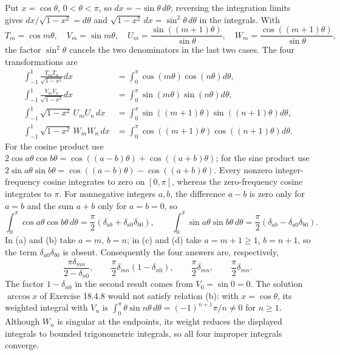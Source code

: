 Put $x=\cos\theta$, $0<\theta<\pi$, so $dx=-\sin\theta\,d\theta$;
reversing the integration limits gives $dx/\sqrt{1-x^2}=d\theta$ and
$\sqrt{1-x^2}\,dx=\sin^2\theta\,d\theta$ in the integrals.
With
\[
T_m=\cos m\theta,\quad V_m=\sin m\theta,\quad
U_m=\frac{\sin((m+1)\theta)}{\sin\theta},\quad
W_m=\frac{\cos((m+1)\theta)}{\sin\theta},
\]
the factor $\sin^2\theta$ cancels the two denominators in the last two
cases.
The four transformations are
\begin{align*}
\int_{-1}^1\frac{T_mT_n}{\sqrt{1-x^2}}dx
 &=\int_0^\pi\cos(m\theta)\cos(n\theta)d\theta,\\
\int_{-1}^1\frac{V_mV_n}{\sqrt{1-x^2}}dx
 &=\int_0^\pi\sin(m\theta)\sin(n\theta)d\theta,\\
\int_{-1}^1\sqrt{1-x^2}\,U_mU_n\,dx
 &=\int_0^\pi\sin((m+1)\theta)\sin((n+1)\theta)d\theta,\\
\int_{-1}^1\sqrt{1-x^2}\,W_mW_n\,dx
 &=\int_0^\pi\cos((m+1)\theta)\cos((n+1)\theta)d\theta.
\end{align*}
For the cosine product use
$2\cos a\theta\cos b\theta=\cos((a-b)\theta)+\cos((a+b)\theta)$;
for the sine product use
$2\sin a\theta\sin b\theta=\cos((a-b)\theta)-\cos((a+b)\theta)$.
Every nonzero integer-frequency cosine integrates to zero on
$[0,\pi]$, whereas the zero-frequency cosine integrates to $\pi$.
For nonnegative integers $a,b$, the difference $a-b$ is zero only for
$a=b$ and the sum $a+b$ only for $a=b=0$, so
\[
\int_0^\pi\cos a\theta\cos b\theta\,d\theta
 =\frac\pi2(\delta_{ab}+\delta_{a0}\delta_{b0}),\qquad
\int_0^\pi\sin a\theta\sin b\theta\,d\theta
 =\frac\pi2(\delta_{ab}-\delta_{a0}\delta_{b0}).
\]
In (a) and (b) take $a=m$, $b=n$; in (c) and (d) take $a=m+1\ge1$,
$b=n+1$, so the term $\delta_{a0}\delta_{b0}$ is absent.
Consequently the four answers are, respectively,
\[
\boxed{\frac{\pi\delta_{mn}}{2-\delta_{n0}}},\qquad
\boxed{\frac\pi2\delta_{mn}(1-\delta_{n0})},\qquad
\boxed{\frac\pi2\delta_{mn}},\qquad
\boxed{\frac\pi2\delta_{mn}}.
\]
The factor $1-\delta_{n0}$ in the second result comes from
$V_0=\sin0=0$.  The solution $\arccos x$ of Exercise 18.4.8 would not
satisfy relation (b): with $x=\cos\theta$, its weighted integral with
$V_n$ is $\int_0^\pi\theta\sin n\theta\,d\theta=(-1)^{n+1}\pi/n\ne0$
for $n\ge1$.
Although $W_n$ is singular at the endpoints, its weight reduces
the displayed integrals to bounded trigonometric integrals, so
all four improper integrals converge.

